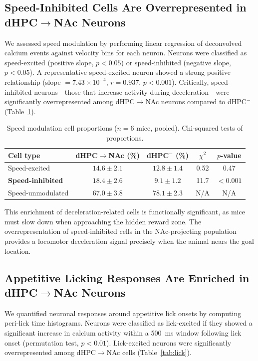 \documentclass[11pt]{article}
\begin{document}
\subsection{Speed-Inhibited Cells Are Overrepresented in dHPC$\to$NAc Neurons}

We assessed speed modulation by performing linear regression of deconvolved calcium events against velocity bins for each neuron. Neurons were classified as speed-excited (positive slope, $p < 0.05$) or speed-inhibited (negative slope, $p < 0.05$). A representative speed-excited neuron showed a strong positive relationship (slope $= 7.43 \times 10^{-4}$, $r = 0.937$, $p < 0.001$). Critically, speed-inhibited neurons---those that increase activity during deceleration---were significantly overrepresented among dHPC$\to$NAc neurons compared to dHPC$^{-}$ (Table~\ref{tab:speed}).

\begin{table}[htbp]
\centering
\caption{Speed modulation cell proportions ($n = 6$ mice, pooled). Chi-squared tests of proportions.}
\label{tab:speed}
\begin{tabular}{lcccc}
\toprule
\textbf{Cell type} & \textbf{dHPC$\to$NAc (\%)} & \textbf{dHPC$^{-}$ (\%)} & \textbf{$\chi^2$} & \textbf{$p$-value} \\
\midrule
Speed-excited & $14.6 \pm 2.1$ & $12.8 \pm 1.4$ & 0.52 & 0.47 \\
\textbf{Speed-inhibited} & $\mathbf{18.4 \pm 2.6}$ & $9.1 \pm 1.2$ & 11.7 & $<0.001$ \\
Speed-unmodulated & $67.0 \pm 3.8$ & $78.1 \pm 2.3$ & N/A & N/A \\
\bottomrule
\end{tabular}
\end{table}

This enrichment of deceleration-related cells is functionally significant, as mice must slow down when approaching the hidden reward zone. The overrepresentation of speed-inhibited cells in the NAc-projecting population provides a locomotor deceleration signal precisely when the animal nears the goal location.

\subsection{Appetitive Licking Responses Are Enriched in dHPC$\to$NAc Neurons}

We quantified neuronal responses around appetitive lick onsets by computing peri-lick time histograms. Neurons were classified as lick-excited if they showed a significant increase in calcium activity within a 500~ms window following lick onset (permutation test, $p < 0.01$). Lick-excited neurons were significantly overrepresented among dHPC$\to$NAc cells (Table~\ref{tab:lick}).
\end{document}

